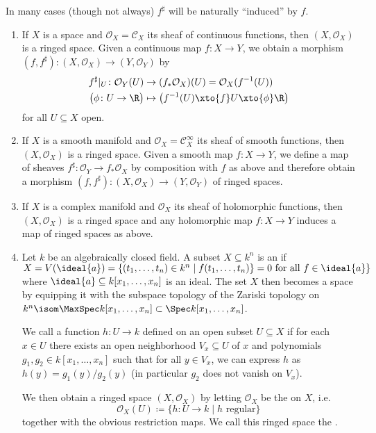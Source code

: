 \documentclass[wip, algebra]{bsteffan-lecturenotes}
\newcommand{\cO}{\mathcal{O}}
\newcommand{\cC}{\mathcal{C}}
\begin{document}
In many cases (though not always) $f^\sharp$ will be naturally \enquote{induced} by $f$.
\begin{example}\label{epl:sch:examples}
	\leavevmode
	\begin{enumerate}
		\item If $X$ is a space and $\cO_X = \cC_X$ its sheaf of continuous functions, then $(X, \cO_X)$ is a ringed space.
			Given a continuous map $f\colon X \to Y$, we obtain a morphism $(f, f^\sharp)\colon (X, \cO_X) \to (Y, \cO_Y)$ by 
			\begin{align*}
				f^\sharp|_U\colon \cO_Y(U) &\to (f_* \cO_X)(U) = \cO_X(f^{-1}(U)) \\
					\big(\phi\colon U \to \R\big) &\mapsto \big(f^{-1}(U) \xto{f} U \xto{\phi} \R\big)
			\end{align*}
			for all $U \subseteq X$ open.
		\item If $X$ is a smooth manifold and $\cO_X = \cC_X^\infty$ its sheaf of smooth functions, then $(X, \cO_X)$ is a ringed space.
			Given a smooth map $f\colon X \to Y$, we define a map of sheaves $f^\sharp\colon \cO_Y \to f_* \cO_X$ by composition with $f$ as above and therefore obtain a morphism $(f, f^\sharp)\colon (X, \cO_X) \to (Y, \cO_Y)$ of ringed spaces.
		\item If $X$ is a complex manifold and $\cO_X$ its sheaf of holomorphic functions, then $(X, \cO_X)$ is a ringed space and any holomorphic map $f\colon X \to Y$ induces a map of ringed spaces as above.
		\item Let $k$ be an algebraically closed field.
			A subset $X \subseteq k^n$ is an  if $X = V(\ideal{a}) = \{(t_1, \ldots, t_n) \in k^n \mid f(t_1, \ldots, t_n)\} = 0 \text{ for all } f \in \ideal{a}\}$ where $\ideal{a} \subseteq k[x_1, \ldots, x_n]$ is an ideal.
			The set $X$ then becomes a space by equipping it with the subspace topology of the Zariski topology on $k^n \isom \MaxSpec k[x_1, \ldots, x_n] \subset \Spec k[x_1, \ldots, x_n]$.

			We call a function $h\colon U \to k$ defined on an open subset $U \subseteq X$  if for each $x \in U$ there exists an open neighborhood $V_x \subseteq U$ of $x$ and polynomials $g_1, g_2 \in k[x_1, \ldots, x_n]$ such that for all $y \in V_x$, we can express $h$ as $h(y) = g_1(y) / g_2(y)$ (in particular $g_2$ does not vanish on $V_x$).

			We then obtain a ringed space $(X, \cO_X)$ by letting $\cO_X$ be the  on $X$, i.e.
			\begin{equation*}
				\cO_X(U) \coloneq \{h\colon U \to k \mid h \text{ regular}\}
			\end{equation*}
			together with the obvious restriction maps.
			We call this ringed space the .
	\end{enumerate}
\end{example}
\end{document}
